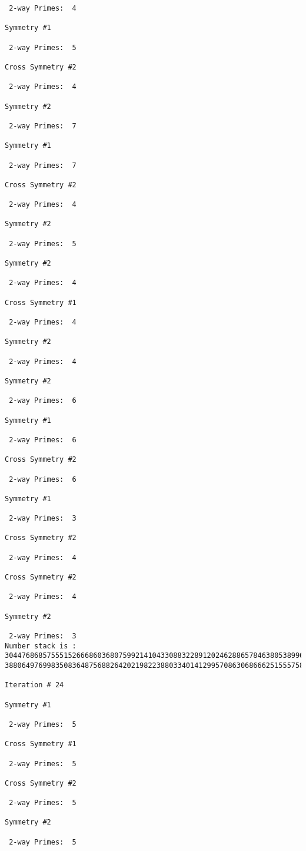 {{{{\begin{verbatim}
 2-way Primes: 	4

Symmetry #1

 2-way Primes: 	5

Cross Symmetry #2

 2-way Primes: 	4

Symmetry #2

 2-way Primes: 	7

Symmetry #1

 2-way Primes: 	7

Cross Symmetry #2

 2-way Primes: 	4

Symmetry #2

 2-way Primes: 	5

Symmetry #2

 2-way Primes: 	4

Cross Symmetry #1

 2-way Primes: 	4

Symmetry #2

 2-way Primes: 	4

Symmetry #2

 2-way Primes: 	6

Symmetry #1

 2-way Primes: 	6

Cross Symmetry #2

 2-way Primes: 	6

Symmetry #1

 2-way Primes: 	3

Cross Symmetry #2

 2-way Primes: 	4

Cross Symmetry #2

 2-way Primes: 	4

Symmetry #2

 2-way Primes: 	3
Number stack is :
30447686857555152666860368075992141043308832289120246288657846380538996794608835958544046240163340857
38806497699835083648756882642021982238803340141299570863068666251555758686744037580433610426404458595

Iteration #	24

Symmetry #1

 2-way Primes: 	5

Cross Symmetry #1

 2-way Primes: 	5

Cross Symmetry #2

 2-way Primes: 	5

Symmetry #2

 2-way Primes: 	5


\end{verbatim}}}}}

